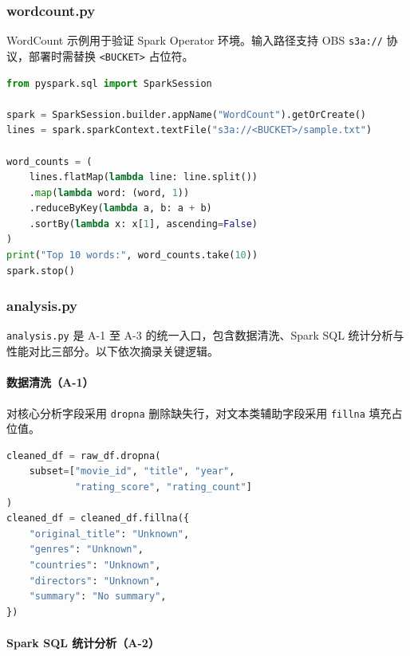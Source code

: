 \subsubsection{wordcount.py}

WordCount 示例用于验证 Spark Operator 环境。输入路径支持 OBS \verb|s3a://| 协议，部署时需替换 \verb|<BUCKET>| 占位符。

\begin{lstlisting}[language=Python, caption={spark/wordcount.py}, label=lst:wordcount]
from pyspark.sql import SparkSession

spark = SparkSession.builder.appName("WordCount").getOrCreate()
lines = spark.sparkContext.textFile("s3a://<BUCKET>/sample.txt")

word_counts = (
    lines.flatMap(lambda line: line.split())
    .map(lambda word: (word, 1))
    .reduceByKey(lambda a, b: a + b)
    .sortBy(lambda x: x[1], ascending=False)
)
print("Top 10 words:", word_counts.take(10))
spark.stop()
\end{lstlisting}

\subsubsection{analysis.py}

\verb|analysis.py| 是 A-1 至 A-3 的统一入口，包含数据清洗、Spark SQL 统计分析与性能对比三部分。以下依次摘录关键逻辑。

\paragraph{数据清洗（A-1）}

对核心分析字段采用 \verb|dropna| 删除缺失行，对文本类辅助字段采用 \verb|fillna| 填充占位值。

\begin{lstlisting}[language=Python, caption={analysis.py 数据清洗核心逻辑}, label=lst:analysis-clean]
cleaned_df = raw_df.dropna(
    subset=["movie_id", "title", "year",
            "rating_score", "rating_count"]
)
cleaned_df = cleaned_df.fillna({
    "original_title": "Unknown",
    "genres": "Unknown",
    "countries": "Unknown",
    "directors": "Unknown",
    "summary": "No summary",
})
\end{lstlisting}

\paragraph{Spark SQL 统计分析（A-2）}

